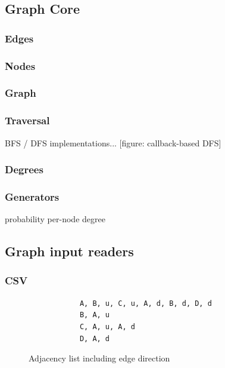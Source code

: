 	\subsection{Graph Core}
	\label{ssect:graph_core}
		
		\subsubsection{Edges}
		\label{sssection: core_edges}
		
		\subsubsection{Nodes}
		\label{sssection: core_nodes}
		
		\subsubsection{Graph}
		\label{sssection: core_graph}
		
		\subsubsection{Traversal}
		\label{sssection: core_traveral}
		
		BFS / DFS implementations... [figure: callback-based DFS]
		
		\subsubsection{Degrees}
		\label{sssection: core_degrees}
		
		\subsubsection{Generators}
		\label{sssection: core_}
		
		probability
		per-node degree

	
	\subsection{Graph input readers}
	\label{ssect:input_output}
		
		\subsubsection{CSV}
		\label{sssection: io_csv}
		
		
		\begin{figure}[ht]
			\begin{lstlisting}
			A, B, u, C, u, A, d, B, d, D, d
			B, A, u
			C, A, u, A, d
			D, A, d
			\end{lstlisting}
			\caption{Adjacency list including edge direction}
			\label{fig:adj_list_direction}
		\end{figure}
		
